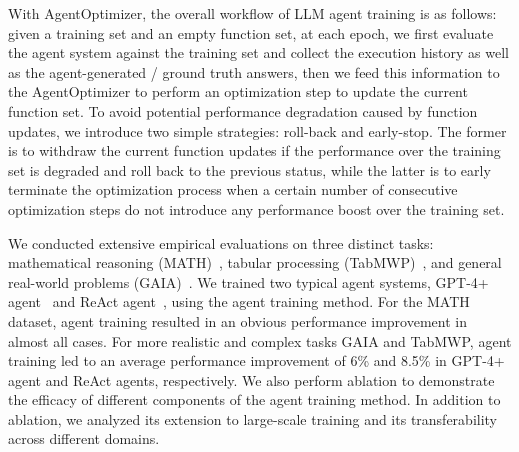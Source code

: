 \documentclass{article}
\theoremstyle{plain}
\theoremstyle{definition}
\theoremstyle{remark}
\begin{document}
With AgentOptimizer, the overall workflow of LLM agent training is as follows: given a training set and an empty function set, at each epoch, we first evaluate the agent system against the training set and collect the execution history as well as the agent-generated / ground truth answers, then we feed this information to the AgentOptimizer to perform an optimization step to update the current function set.
To avoid potential performance degradation caused by function updates, we introduce two simple strategies: roll-back and early-stop.
The former is to withdraw the current function updates if the performance over the training set is degraded and roll back to the previous status, while the latter is to early terminate the optimization process when a certain number of consecutive optimization steps do not introduce any performance boost over the training set.


We conducted extensive empirical evaluations on three distinct tasks: mathematical reasoning (MATH)~\cite{hendrycks2021measuring}, tabular processing (TabMWP)~\cite{lu2023dynamic}, and general real-world problems (GAIA)~\cite{mialon2023gaia}. We trained two typical agent systems, GPT-4+ agent~\cite{openai2023gpt} and ReAct agent~\cite{yao2022react}, using the agent training method.
For the MATH dataset, agent training resulted in an obvious performance improvement in almost all cases. For more realistic and complex tasks GAIA and TabMWP, agent training led to an average performance improvement of 6\% and 8.5\% in GPT-4+ agent and ReAct agents, respectively.
We also perform ablation to demonstrate the efficacy of different components of the agent training method. In addition to ablation, we analyzed its extension to large-scale training and its transferability across different domains. 
\end{document}
